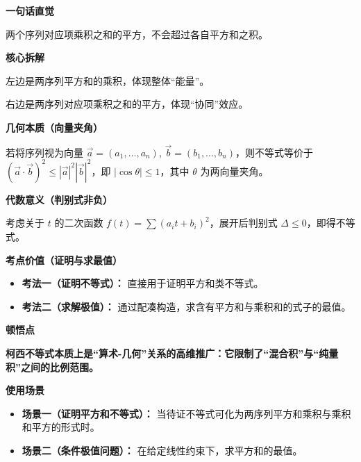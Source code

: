 \begin{explanationbox}
\textbf{\textcolor{CExplanation}{一句话直觉}}

两个序列对应项乘积之和的平方，不会超过各自平方和之积。

\medskip
\textbf{\textcolor{CExplanation}{核心拆解}}
\begin{description}[style=nextline, leftmargin=2.8em, labelsep=0.5em, itemsep=0.45em]
    \item[\textbf{要点一（平方和乘积）：}] 左边是两序列平方和的乘积，体现整体“能量”。
    \item[\textbf{要点二（乘积和平方）：}] 右边是两序列对应项乘积之和的平方，体现“协同”效应。
\end{description}

\medskip
\textbf{\textcolor{CExplanation}{几何本质（向量夹角）}}

若将序列视为向量 $\vec{a}=(a_1,\dots,a_n)$, $\vec{b}=(b_1,\dots,b_n)$，则不等式等价于 $(\vec{a}\cdot\vec{b})^2 \le |\vec{a}|^2|\vec{b}|^2$，即 $|\cos\theta| \le 1$，其中 $\theta$ 为两向量夹角。

\medskip
\textbf{\textcolor{CExplanation}{代数意义（判别式非负）}}

考虑关于 $t$ 的二次函数 $f(t)=\sum (a_i t + b_i)^2$，展开后判别式 $\Delta \le 0$，即得不等式。

\medskip
\textbf{\textcolor{CExplanation}{考点价值（证明与求最值）}}
\begin{itemize}[leftmargin=*, itemsep=0.5em, topsep=0.4em]
    \item \textbf{考法一（证明不等式）：} 直接用于证明平方和类不等式。
    \item \textbf{考法二（求解极值）：} 通过配凑构造，求含有平方和与乘积和的式子的最值。
\end{itemize}

\medskip
\textbf{\textcolor{CExplanation}{顿悟点}}

\textbf{柯西不等式本质上是“算术-几何”关系的高维推广：它限制了“混合积”与“纯量积”之间的比例范围。}

\medskip
\textbf{\textcolor{CExplanation}{使用场景}}
\begin{itemize}[leftmargin=*, itemsep=0.5em, topsep=0.4em]
    \item \textbf{场景一（证明平方和不等式）：} 当待证不等式可化为两序列平方和乘积与乘积和平方的形式时。
    \item \textbf{场景二（条件极值问题）：} 在给定线性约束下，求平方和的最值。
\end{itemize}
\end{explanationbox}
